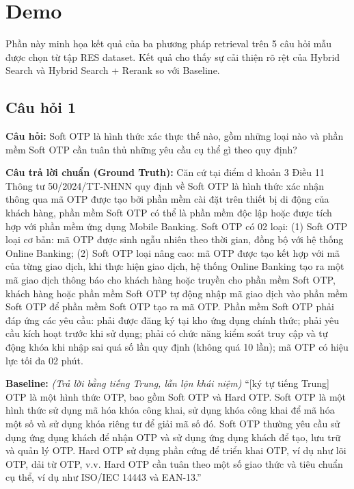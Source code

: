 \section{Demo}

Phần này minh họa kết quả của ba phương pháp retrieval trên 5 câu hỏi mẫu được chọn từ tập RES dataset. Kết quả cho thấy sự cải thiện rõ rệt của Hybrid Search và Hybrid Search + Rerank so với Baseline.

\subsection*{Câu hỏi 1}

\textbf{Câu hỏi:} Soft OTP là hình thức xác thực thế nào, gồm những loại nào và phần mềm Soft OTP cần tuân thủ những yêu cầu cụ thể gì theo quy định?

\textbf{Câu trả lời chuẩn (Ground Truth):} Căn cứ tại điểm d khoản 3 Điều 11 Thông tư 50/2024/TT-NHNN quy định về Soft OTP là hình thức xác nhận thông qua mã OTP được tạo bởi phần mềm cài đặt trên thiết bị di động của khách hàng, phần mềm Soft OTP có thể là phần mềm độc lập hoặc được tích hợp với phần mềm ứng dụng Mobile Banking. Soft OTP có 02 loại: (1) Soft OTP loại cơ bản: mã OTP được sinh ngẫu nhiên theo thời gian, đồng bộ với hệ thống Online Banking; (2) Soft OTP loại nâng cao: mã OTP được tạo kết hợp với mã của từng giao dịch, khi thực hiện giao dịch, hệ thống Online Banking tạo ra một mã giao dịch thông báo cho khách hàng hoặc truyền cho phần mềm Soft OTP, khách hàng hoặc phần mềm Soft OTP tự động nhập mã giao dịch vào phần mềm Soft OTP để phần mềm Soft OTP tạo ra mã OTP. Phần mềm Soft OTP phải đáp ứng các yêu cầu: phải được đăng ký tại kho ứng dụng chính thức; phải yêu cầu kích hoạt trước khi sử dụng; phải có chức năng kiểm soát truy cập và tự động khóa khi nhập sai quá số lần quy định (không quá 10 lần); mã OTP có hiệu lực tối đa 02 phút.

\textbf{Baseline:} \textit{(Trả lời bằng tiếng Trung, lẫn lộn khái niệm)} ``[ký tự tiếng Trung] OTP là một hình thức OTP, bao gồm Soft OTP và Hard OTP. Soft OTP là một hình thức sử dụng mã hóa khóa công khai, sử dụng khóa công khai để mã hóa một số và sử dụng khóa riêng tư để giải mã số đó. Soft OTP thường yêu cầu sử dụng ứng dụng khách để nhận OTP và sử dụng ứng dụng khách để tạo, lưu trữ và quản lý OTP. Hard OTP sử dụng phần cứng để triển khai OTP, ví dụ như lõi OTP, dải từ OTP, v.v. Hard OTP cần tuân theo một số giao thức và tiêu chuẩn cụ thể, ví dụ như ISO/IEC 14443 và EAN-13.''

